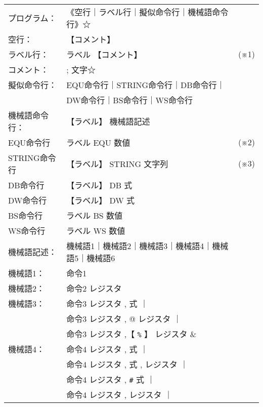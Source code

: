 {\small\tt
\begin{tabular}{l l l}
プログラム：  & 《空行｜ラベル行｜擬似命令行｜機械語命令行》☆ &       \\
空行：        & 【コメント】 \n                                &       \\
ラベル行：    & ラベル 【コメント】 \n                         & (※1) \\
コメント：    & ; 文字☆                                       &       \\
擬似命令行：  & EQU命令行｜STRING命令行｜DB命令行｜            &       \\
              & DW命令行｜BS命令行｜WS命令行                   &       \\
機械語命令行：& 【ラベル】 機械語記述 \n                       &       \\
EQU命令行     & ラベル EQU 数値 \n                             & (※2) \\
STRING命令行  & 【ラベル】 STRING 文字列 \n                    & (※3) \\
DB命令行      & 【ラベル】 DB 式 \n                            &       \\
DW命令行      & 【ラベル】 DW 式 \n                            &       \\
BS命令行      & ラベル BS 数値 \n                              &       \\
WS命令行      & ラベル WS 数値 \n                              &       \\
機械語記述：  & 機械語1｜機械語2｜機械語3｜機械語4｜機械語5｜機械語6 & \\
機械語1：     & 命令1                                          &       \\
機械語2：     & 命令2 レジスタ                                 &       \\
機械語3：     & 命令3 レジスタ , 式                      ｜    &       \\
              & 命令3 レジスタ , @ レジスタ              ｜    &       \\
              & 命令3 レジスタ ,【 \verb/%/ 】 レジスタ        &       \\
機械語4：     & 命令4 レジスタ , 式                      ｜    &       \\
              & 命令4 レジスタ , 式 , レジスタ           ｜    &       \\
              & 命令4 レジスタ , \verb/#/ 式             ｜    &       \\
              & 命令4 レジスタ , レジスタ                ｜    &       \\

\end{tabular}}
